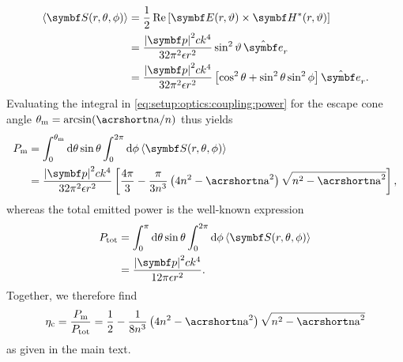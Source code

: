 \begin{equation}
    \begin{split}
        \expval{\bvec{S}(r, \theta, \phi)} &= \frac{1}{2}\re\left[\bvec{E}(r, \vartheta)\times\bvec{H}^{\ast}(r, \vartheta)\right] \\
                                           &= \frac{\abs{\bvec{p}}^2 c k^4}{32\pi^2\epsilon r^2}\sin^2\vartheta \,\ubvec{r} \\
                                           &= \frac{\abs{\bvec{p}}^2 c k^4}{32\pi^2\epsilon r^2}\left[\cos^2\theta + \sin^2\theta\sin^2\phi\right] \ubvec{r}.
    \end{split}
\end{equation}
Evaluating the integral in \cref{eq:setup:optics:coupling:power} for the escape cone angle $\theta_{\mr{m}} = \arcsin(\NA/n)$ thus yields
\begin{equation}
    \begin{split}
        P_{\mr{m}} &= \int_{0}^{\theta_{\mr{m}}}\dd{\theta}\sin\theta\int_{0}^{2\pi}\dd{\phi}\expval{\bvec{S}(r, \theta, \phi)} \\
                   &= \frac{\abs{\bvec{p}}^2 c k^4}{32\pi^2\epsilon r^2}\left[\frac{4\pi}{3} - \frac{\pi}{3 n^3} \left(4n^2 - \NA^2\right)\sqrt{n^2 - \NA^2}\right],
    \end{split}
\end{equation}
whereas the total emitted power is the well-known expression
\begin{equation}
    \begin{split}
        P_{\mr{tot}} &= \int_{0}^{\pi}\dd{\theta}\sin\theta\int_{0}^{2\pi}\dd{\phi}\expval{\bvec{S}(r, \theta, \phi)} \\
                     &= \frac{\abs{\bvec{p}}^2 c k^4}{12\pi\epsilon r^2}.
    \end{split}
\end{equation}
Together, we therefore find
\begin{equation}
    \eta_{\mr{c}} = \frac{P_{\mr{m}}}{P_{\mr{tot}}} = \frac{1}{2} - \frac{1}{8 n^3} \left(4n^2 - \NA^2\right)\sqrt{n^2 - \NA^2}
\end{equation}
as given in the main text.

